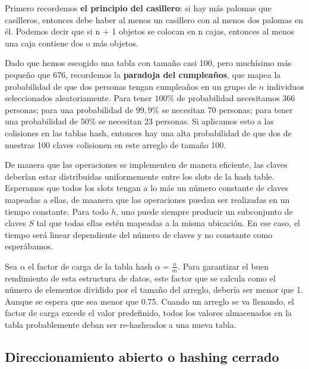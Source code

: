 Primero recordemos \textbf{el principio del casillero}: si hay más palomas que casilleros, entonces debe haber al menos un casillero con al menos dos palomas en él. Podemos decir que si n + 1 objetos se colocan en n cajas, entonces al menos una caja contiene dos o más objetos.

Dado que hemos escogido una tabla con tamaño casi 100, pero muchísimo más pequeño que 676, recordemos la \textbf{paradoja del cumpleaños}, que mapea la probabilidad de que dos personas tengan cumpleaños en un grupo de $n$ individuos seleccionados aleatoriamente. Para tener $100\%$ de probabilidad necesitamos 366 personas;  para una probabilidad de $99,9\%$ se necesitan 70 personas; para tener una probabilidad de $50\%$ se necesitan 23 personas. Si aplicamos esto a las colisiones en las tablas hash, entonces hay una alta probabilidad de que dos de nuestras 100 claves colisionen en este arreglo de tamaño 100. 




\begin{tcolorbox}[colback=gray!5!white,colframe=orange!60!gray,title=Eficiencia] De manera que las operaciones se implementen de manera eficiente, las claves deberían estar distribuidas uniformemente entre los slots de la hash table. Esperamos que todos los slots tengan a lo más un número constante de claves mapeadas a ellas, de maanera que las operaciones puedan ser realizadas en un tiempo constante. Para todo $h$, uno puede siempre producir un subconjunto de claves $S$ tal que todas ellas estén mapeadas a la misma ubicación. En ese caso, el tiempo será linear dependiente del número de claves y no constante como esperábamos.   
\end{tcolorbox}


Sea $\alpha$ el factor de carga de la tabla hash $\alpha=\frac{n}{m}$.  Para garantizar el buen rendimiento de esta estructura de datos, este factor que se calcula como el número de elementos dividido por el tamaño del arreglo, debería ser menor que 1. Aunque se espera que sea menor que 0.75. Cuando un arreglo se va llenando, el factor de carga excede el valor predefinido, todos los valores almacenados en la tabla probablemente deban ser re-hasheados a una nueva tabla. 

\color{black}



\subsection{Direccionamiento abierto o hashing cerrado }


